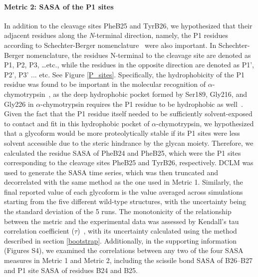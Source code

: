 \documentclass[9pt]{elife}
\begin{document}
\paragraph{Metric 2: SASA of the P1 sites}
In addition to the cleavage sites PheB25 and TyrB26, we hypothesized that their adjacent residues along the \emph{N}-terminal direction, namely, the P1 residues according to Schechter-Berger nomenclature~\cite{schechter1968active} were also important. In Schechter-Berger nomenclature, the residues N-terminal to the cleavage site are denoted as P1, P2, P3, \ldots etc., while the residues in the opposite direction are denoted as P1', P2', P3' ... etc. See Figure \ref{P_sites}. Specifically, the hydrophobicity of the P1 residue was found to be important in the molecular recognition of $\alpha$-chymotrypsin~\cite{appel1986chymotrypsin}, as the deep hydrophobic pocket formed by Ser189, Gly216, and Gly226 in $\alpha$-chymotrypsin requires the P1 residue to be hydrophobic as well~\cite{hedstrom2002serine}. Given the fact that the P1 residue itself needed to be sufficiently solvent-exposed to contact and fit in this hydrophobic pocket of $\alpha$-chymotrypsin, we hypothesized that a glycoform would be more proteolytically stable if its P1 sites were less solvent accessible due to the steric hindrance by the glycan moiety. Therefore, we calculated the residue SASA of PheB24 and PheB25, which were the P1 sites corresponding to the cleavage sites PheB25 and TyrB26, respectively. DCLM was used to generate the SASA time series, which was then truncated and decorrelated with the same method as the one used in Metric 1. Similarly, the final reported value of each glycoform is the value averaged across simulations starting from the five different wild-type structures, with the uncertainty being the standard deviation of the 5 runs. The monotonicity of the relationship between the metric and the experimental data was assessed by Kendall's tau correlation coefficient ($\tau$)~\cite{kendall1948advanced}, with its uncertainty calculated using the method described in section \ref{bootstrap}. Additionally, in the supporting information (Figures S4), we examined the correlations between any two of the four SASA measures in Metric 1 and Metric 2, including the scissile bond SASA of B26--B27 and P1 site SASA of residues B24 and B25. 
\end{document}
